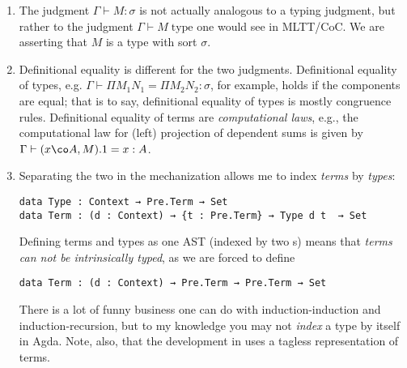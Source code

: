\documentclass[authoryear,acmsmall,screen]{acmart}
\begin{document}
\begin{enumerate}
\item The judgment $\Gamma \vdash M : \sigma$ is not actually analogous to a typing judgment, but rather to the judgment $\Gamma \vdash M \; \text{type}$ one would see in MLTT/CoC. We are asserting that $M$ is a type with sort $\sigma$.
\item Definitional equality is different for the two judgments. Definitional equality of types, e.g. $\Gamma \vdash \Pi M_{1} N_{1} = \Pi M_{2} N_{2} : \sigma$, for example, holds if the components are equal; that is to say, definitional equality of types is mostly congruence rules. Definitional equality of terms are \emph{computational laws}, e.g., the computational law for (left) projection of dependent sums is given by $\Gamma \vdash (x \co A , M ).1 = x : A$.
\item Separating the two in the mechanization allows me to index \emph{terms} by \emph{types}:
\begin{verbatim}
data Type : Context → Pre.Term → Set
data Term : (d : Context) → {t : Pre.Term} → Type d t  → Set
\end{verbatim}

Defining terms and types as one AST (indexed by two s) means that \emph{terms can not be intrinsically typed}, as we are forced to define
\begin{verbatim}
data Term : (d : Context) → Pre.Term → Pre.Term → Set
\end{verbatim}

There is a lot of funny business one can do with induction-induction and induction-recursion, but to my knowledge you may not \emph{index} a type by itself in Agda. Note, also, that the development in \cite{AbelOV18} uses a tagless representation of terms.

\end{enumerate}
\end{document}
